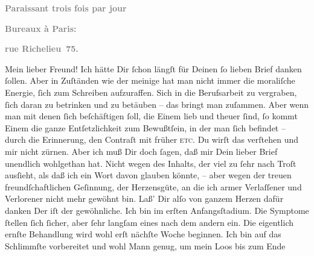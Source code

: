 \begin{ledgroupsized}[t]{13cm}
           \pstart
           \begin{otherlanguage}{french}\textcolor{gray}{\textbf{\textbf{Paraissant trois fois par jour}}}\end{otherlanguage}\pend
           \pstart
           \begin{otherlanguage}{french}\textcolor{gray}{\textbf{\textbf{Bureaux à Paris:}}}\end{otherlanguage}\pend
           \pstart
           \begin{otherlanguage}{french}\textcolor{gray}{\textbf{\textbf{rue Richelieu 75.}}}\end{otherlanguage}\pend
           \pstart\center{}Mein lieber Freund!\pend\pstart
           Ich hätte Dir ſchon längſt für Deinen ſo lieben Brief danken ſollen. Aber in
               Zuſtänden wie der meinige hat man nicht immer die moraliſche Energie, ſich zum
               Schreiben aufzuraffen. Sich in die Berufsarbeit zu vergraben, ſich daran zu betrinken
               und zu betäuben – das bringt man zuſammen. Aber wenn man mit denen ſich beſchäftigen
               ſoll, die Einem lieb und theuer ſind, ſo kommt Einem die ganze Entſetzlichkeit zum
               Bewußtſein, in der man ſich befindet – durch die Erin{\pb}nerung, den Contraſt mit früher \textsc{etc}. Du wirſt das
               verſtehen und mir nicht zürnen.\pend
           \pstart
           Aber ich muß Dir doch ſagen, daß mir Dein lieber Brief unendlich wohlgethan hat.
               Nicht wegen des Inhalts, der viel zu ſehr nach Troſt ausſieht, als daß ich ein Wort
               davon glauben könnte, – aber wegen der treuen freundſchaftlichen Geſinnung, der
               Herzensgüte, an die ich armer Verlaſſener und Verlorener nicht mehr gewöhnt bin. Laß’
               Dir alſo von ganzem Herzen dafür danken{\dotsfour}\pend
           \pstart
           Der \label{K_L02705-1v}\label{K_L02705-1h} iſt der gewöhnliche. Ich bin im erſten Anfangsſtadium. Die Symptome ſtellen
               ſich ſicher, aber ſehr langſam eines nach dem {\pb}andern ein. Die eigentlich ernſte Behandlung wird wohl erſt nächſte Woche beginnen.
               Ich bin auf das Schlimmſte vorbereitet und wohl Mann genug, um mein Loos bis zum Ende

\end{ledgroupsized}
